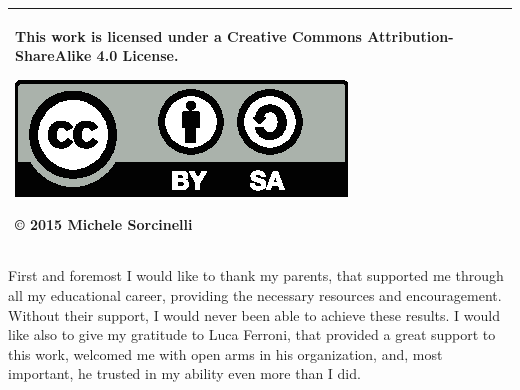 \documentclass[a4paper,singleside,11pt]{report}
\begin{document}



\copertinatesi 
\begin{tabular}{|p{}|}
 \hline
 This work is licensed under a Creative Commons Attribution-ShareAlike 4.0
 License.
 \begin{center}
 \includegraphics[scale=1]{by-sa.eps}
 \end{center}
 © 2015 Michele Sorcinelli\\
 \hline
 \end{tabular}
\indice
\indicefigure
\indicetabelle
\iniziatesto









\appendix



\ringraziamenti

First and foremost I would like to thank my parents, that supported me through
all my educational career, providing the necessary resources and encouragement.
Without their support, I would never been able to achieve these results. I would
like also to give my gratitude to Luca Ferroni, that provided a great support to
this work, welcomed me with open arms in his organization, and, most important,
he trusted in my ability even more than I did.
\end{document}
